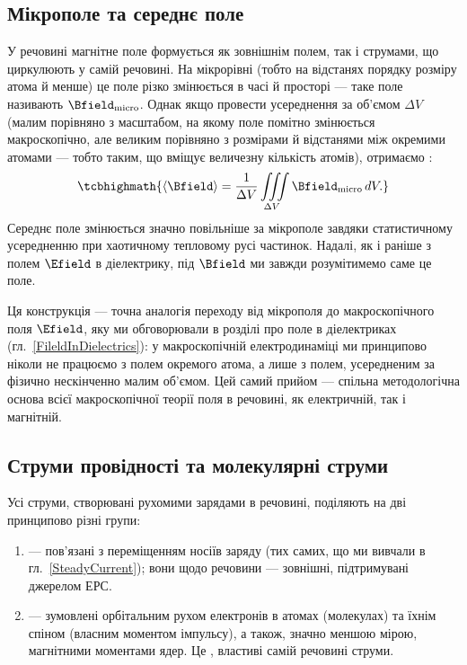 \subsection*{Мікрополе та середнє поле}

У речовині магнітне поле формується як зовнішнім полем, так і струмами, що циркулюють у самій речовині. На мікрорівні (тобто на відстанях порядку
розміру атома й менше) це поле різко змінюється в часі й просторі --- таке поле називають  $\Bfield_\text{micro}$. Однак якщо
провести усереднення за  об'ємом $\Delta V$ (малим порівняно з масштабом, на якому поле помітно змінюється
макроскопічно, але великим порівняно з розмірами й відстанями між окремими атомами --- тобто таким, що вміщує величезну кількість атомів), отримаємо
:
\begin{equation}\label{eq:AvgField}
	\tcbhighmath{
		\langle\Bfield\rangle = \frac1{\Delta V}\iiint\limits_{\Delta V} \Bfield_\text{micro}\, dV.
	}
\end{equation}
Середнє поле змінюється значно повільніше за мікрополе завдяки статистичному усередненню при хаотичному тепловому русі частинок. Надалі, як і
раніше з полем $\Efield$ в діелектрику, під $\Bfield$ ми завжди розумітимемо саме це  поле.

\begin{Attention}
	Ця конструкція --- точна аналогія переходу від мікрополя до макроскопічного поля $\Efield$, яку ми обговорювали в розділі про поле в
	діелектриках (гл.~\ref{FileldInDielectrics}): у макроскопічній електродинаміці ми принципово ніколи не працюємо з полем окремого атома, а лише
	з полем, усередненим за фізично нескінченно малим об'ємом. Цей самий прийом --- спільна методологічна основа всієї макроскопічної теорії поля
	в речовині, як електричній, так і магнітній.
\end{Attention}

\subsection*{Струми провідності та молекулярні струми}

Усі струми, створювані рухомими зарядами в речовині, поділяють на дві принципово різні групи:
\begin{enumerate}
	\item {} --- пов'язані з переміщенням  носіїв заряду (тих самих, що ми вивчали в
	      гл.~\ref{SteadyCurrent}); вони  щодо речовини --- зовнішні, підтримувані джерелом ЕРС.
	\item {} --- зумовлені орбітальним рухом електронів в атомах (молекулах) та їхнім спіном (власним моментом імпульсу), а
	      також, значно меншою мірою, магнітними моментами ядер. Це , властиві самій речовині струми.
\end{enumerate}

